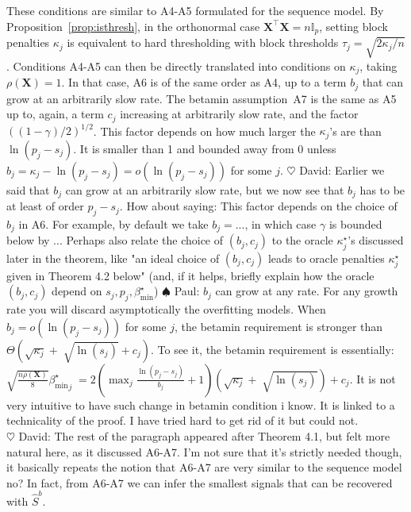 \documentclass[aos]{imsart}
\theoremstyle{plain}
\newcommand{\david}[1]{{\small{\color{blue} \sf $\heartsuit$ David: #1}}}
\newcommand{\paul}[1]{{\small{\color{green} \sf $\spadesuit$ Paul: #1}}}
\newcommand{\I}{\mathbb{I}}
\newcommand{\bs}{\boldsymbol}
\begin{document}
These conditions are similar to A4-A5 formulated for the sequence model.
 By Proposition~\ref{prop:isthresh}, in the orthonormal %
 case $\bs X^{\top}\bs X=n\I_p$, setting block penalties $\kappa_j$ %
 is equivalent to hard thresholding with block thresholds $\tau_j=\sqrt{2 \kappa_j/n}$.
 Conditions A4-A5 can then be directly translated into conditions on $\kappa_j$, taking $\rho(\bs X)=1$. In that case, A6 is of the same order as A4, up to a term $b_j$ that can grow at an arbitrarily slow rate.
The betamin assumption~A7 is the same as A5 up to, again, a term $c_j$ increasing at arbitrarily slow rate, and the factor $((1-\gamma)/2)^{1/2}$. This factor depends on how much larger the $\kappa_j$'s are than $\ln(p_j-s_j)$. It is smaller than 1 and bounded away from 0 unless $b_j= \kappa_j - \ln(p_j-s_j)= o(\ln(p_j-s_j))$ for some $j$.
\david{Earlier we said that $b_j$ can grow at an arbitrarily slow rate, but we now see that $b_j$ has to be at least of order $p_j-s_j$. How about saying: This factor depends on the choice of $b_j$ in A6. For example, by default we take $b_j=...$, in which case $\gamma$ is bounded below by ... Perhaps also relate the choice of $(b_j,c_j)$ to the oracle $\kappa_j^\star$'s discussed later in the theorem, like "an ideal choice of $(b_j,c_j)$ leads to oracle penalties $\kappa_j^\star$ given in Theorem 4.2 below" (and, if it helps, briefly explain how the oracle $(b_j,c_j)$ depend on $s_j,p_j,\beta_{\min}^\star$)} \paul{$b_j$ can grow at any rate.  For any growth rate you will discard asymptotically the overfitting models. When $b_j= o(\ln(p_j-s_j))$ for some $j$, the betamin requirement is stronger than $\Theta(\sqrt{\kappa_j} +\; \sqrt{\ln(s_j)} + c_{j})$. To see it, the betamin requirement is essentially: $\sqrt{\frac{ n\rho(\bs X)}{8}}{{\beta_{\min}^{\star}}_j}  \;=2(\max_j\frac{\ln(p_j-s_j)}{b_j}+1)(\sqrt{\kappa_j} +\; \sqrt{\ln(s_j)}) + c_{j}$. It is not very intuitive to have such change in betamin condition i know. It is linked to a technicality of the proof. I have tried hard to get rid of it but could not. \\}
\david{The rest of the paragraph appeared after Theorem 4.1, but felt more natural here, as it discussed A6-A7. I'm not sure that it's strictly needed though, it basically repeats the notion that A6-A7 are very similar to the sequence model no?} In fact, from A6-A7 we can infer the smallest signals that can be recovered with $\hat{S}^{b}$. %
\end{document}
